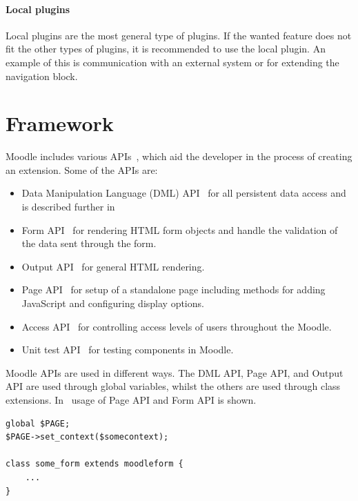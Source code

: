 \paragraph{Local plugins}
\label{par:localplugin}
Local plugins are the most general type of plugins. If the wanted feature does not fit the other types of plugins, it is recommended to use the local plugin. An example of this is communication with an external system or for extending the navigation block. 



\section{Framework}
Moodle includes various APIs~\cite{moodlecoreapis}, which aid the developer in the process of creating an extension. Some of the APIs are:

\begin{itemize}
	\item Data Manipulation Language (DML) API~\cite{moodledml} for all persistent data access and is described further in 
	\item Form API~\cite{moodleformapi} for rendering HTML form objects and handle the validation of the data sent through the form. 
	\item Output API~\cite{moodleoutputapi} for general HTML rendering.
	\item Page API~\cite{moodlepageapi} for setup of a standalone page including methods for adding JavaScript and configuring display options. 
	\item Access API~\cite{moodleaccessapi} for controlling access levels of users throughout the Moodle. 
	\item Unit test API~\cite{moodleunittestapi} for testing components in Moodle.
\end{itemize}
Moodle APIs are used in different ways. The DML API, Page API, and Output API are used through global variables, whilst the others are used through class extensions. 
In~ usage of Page API and Form API is shown.
\begin{lstlisting}[style=phpCode, caption=\myCaption{Example of the Page API and Form API in Moodle}, label=moodleapiusage]
global $PAGE;
$PAGE->set_context($somecontext);

class some_form extends moodleform {
	...
}
\end{lstlisting}

